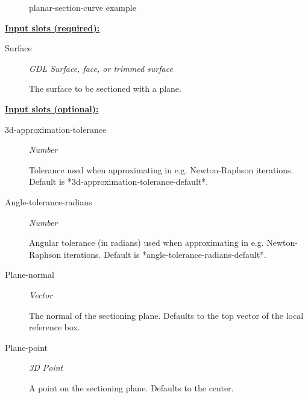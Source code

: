 \documentclass [11pt]{book}
\begin{document}
\begin{itemize}
\begin{figure}
\caption{planar-section-curve example}

\label{fig:planar-section-curve}

\end{figure}





\textbf{
\underline{Input slots (required):}}

\begin{description}

\item [Surface]
\emph{GDL Surface, face, or trimmed surface}

 The surface to be sectioned with a plane.




\end{description}






\textbf{
\underline{Input slots (optional):}}

\begin{description}

\item [3d-approximation-tolerance]
\emph{Number}

 Tolerance used when approximating in e.g. Newton-Raphson iterations.
Default is *3d-approximation-tolerance-default*.




\item [Angle-tolerance-radians]
\emph{Number}

 Angular tolerance (in radians) used when approximating in e.g. Newton-Raphson iterations.
Default is *angle-tolerance-radians-default*.




\item [Plane-normal]
\emph{Vector}

 The normal of the sectioning plane. Defaults to the top vector of the local reference box.




\item [Plane-point]
\emph{3D Point}

 A point on the sectioning plane. Defaults to the center.





\end{description}
\end{itemize}
\end{document}
